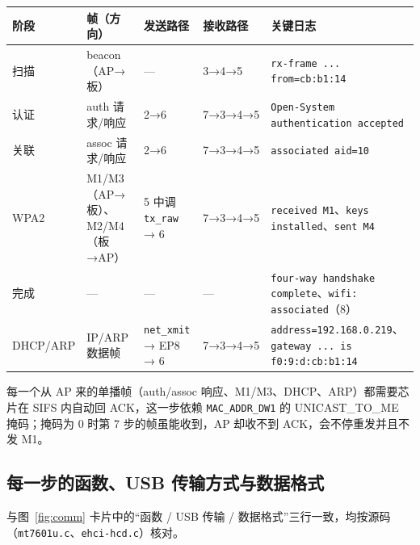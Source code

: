 \documentclass[UTF8,zihao=-4,fontset=none]{ctexart}
\newcommand{\fn}[1]{\texttt{#1}}
\begin{document}
\begin{longtable}{p{12mm}p{30mm}p{25mm}p{22mm}p{62mm}}
\toprule
阶段 & 帧（方向） & 发送路径 & 接收路径 & 关键日志 \\ \midrule \endhead
扫描 & beacon（AP→板） & — & 3→4→5 & \fn{rx-frame ... from=cb:b1:14} \\
认证 & auth 请求/响应 & 2→6 & 7→3→4→5 & \fn{Open-System authentication accepted} \\
关联 & assoc 请求/响应 & 2→6 & 7→3→4→5 & \fn{associated aid=10} \\
WPA2 & M1/M3（AP→板）、M2/M4（板→AP） & 5 中调 \fn{tx\_raw} → 6 & 7→3→4→5 & \fn{received M1}、\fn{keys installed}、\fn{sent M4} \\
完成 & — & — & — & \fn{four-way handshake complete}、\fn{wifi: associated}（8） \\
DHCP/ARP & IP/ARP 数据帧 & \fn{net\_xmit} → EP8 → 6 & 7→3→4→5 & \fn{address=192.168.0.219}、\fn{gateway ... is f0:9:d:cb:b1:14} \\
\bottomrule
\end{longtable}

每一个从 AP 来的单播帧（auth/assoc 响应、M1/M3、DHCP、ARP）都需要芯片在 SIFS 内自动回 ACK，这一步依赖 \fn{MAC\_ADDR\_DW1} 的 UNICAST\_TO\_ME 掩码；掩码为 0 时第 7 步的帧虽能收到，AP 却收不到 ACK，会不停重发并且不发 M1。

\subsection{每一步的函数、USB 传输方式与数据格式}\label{sec:steps-detail}

与图~\ref{fig:comm} 卡片中的“函数 / USB 传输 / 数据格式”三行一致，均按源码（\fn{mt7601u.c}、\fn{ehci-hcd.c}）核对。
\end{document}
